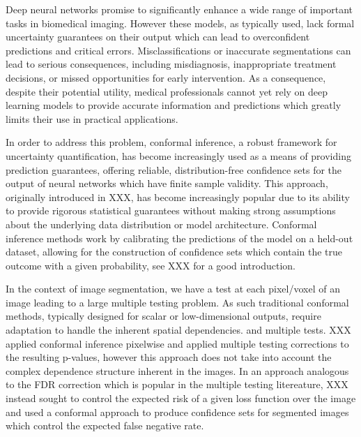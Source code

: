 


Deep neural networks promise to significantly enhance a wide range of important tasks in biomedical imaging. However these models, as typically used, lack formal uncertainty guarantees on their output which can lead to overconfident predictions and critical errors. Misclassifications or inaccurate segmentations can lead to serious consequences, including misdiagnosis, inappropriate treatment decisions, or missed opportunities for early intervention. As a consequence, despite their potential utility, medical professionals cannot yet rely on deep learning models to provide accurate information and predictions which greatly limits their use in practical applications. 

In order to address this problem, conformal inference, a robust framework for uncertainty quantification, has become increasingly used as a means of providing prediction guarantees, offering reliable, distribution-free confidence sets for the output of neural networks which have finite sample validity. This approach, originally introduced in XXX, has become increasingly popular due to its ability to provide rigorous statistical guarantees without making strong assumptions about the underlying data distribution or model architecture. Conformal inference methods work by calibrating the predictions of the model on a held-out dataset, allowing for the construction of confidence sets which contain the true outcome with a given probability, see XXX for a good introduction. 

In the context of image segmentation, we have a test at each pixel/voxel of an image leading to a large multiple testing problem. As such traditional conformal methods, typically designed for scalar or low-dimensional outputs, require adaptation to handle the inherent spatial dependencies. and multiple tests. XXX applied conformal inference pixelwise and applied multiple testing corrections to the resulting p-values, however this approach does not take into account the complex dependence structure inherent in the images. In an approach analogous to the FDR correction which is popular in the multiple testing litereature, XXX instead sought to control the expected risk of a given loss function over the image and used a conformal approach to produce confidence sets for segmented images which control the expected false negative rate. 

